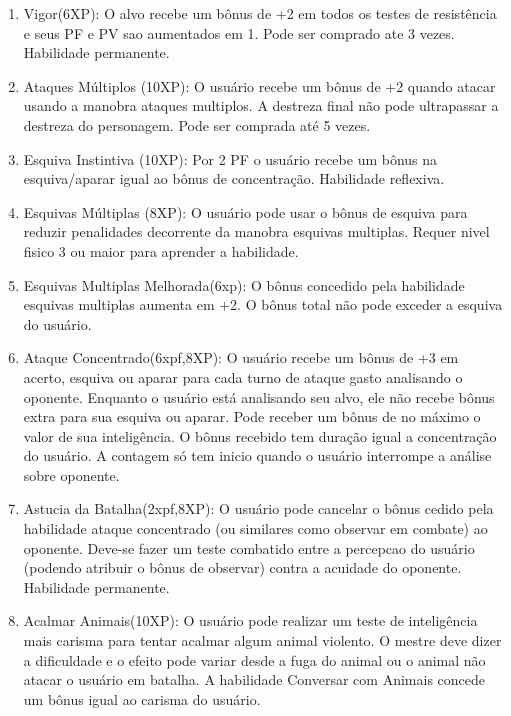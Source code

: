 \begin{enumerate}
	
	\item Vigor(6XP): O alvo recebe um bônus de +2 em todos os testes de resistência e seus PF e PV sao aumentados em 1. Pode ser comprado ate 3 vezes. Habilidade permanente.

	\item Ataques Múltiplos (10XP): O usuário recebe um bônus de +2 quando atacar usando a manobra ataques multiplos. A destreza final não pode ultrapassar a destreza do personagem. Pode ser comprada até 5 vezes.

	\item Esquiva Instintiva (10XP): Por 2 PF o usuário recebe um bônus na esquiva/aparar igual ao bônus de concentração. Habilidade reflexiva.
	
	\item Esquivas Múltiplas (8XP): O usuário pode usar o bônus de esquiva para reduzir penalidades decorrente da manobra esquivas multiplas. Requer nivel fisico 3 ou maior para aprender a habilidade.	

	\item Esquivas Multiplas Melhorada(6xp): O bônus concedido pela habilidade esquivas multiplas aumenta em +2. O bônus total não pode exceder a esquiva do usuário.

	\item Ataque Concentrado(6xpf,8XP): O usuário recebe um bônus de +3 em acerto, esquiva ou aparar para cada turno de ataque gasto analisando o oponente. Enquanto o usuário está analisando seu alvo, ele não recebe bônus extra para sua esquiva ou aparar. Pode receber um bônus de no máximo o valor de sua inteligência. O bônus recebido tem duração igual a concentração do usuário. A contagem só tem inicio quando o usuário interrompe a análise sobre oponente.

	\item Astucia da Batalha(2xpf,8XP): O usuário pode cancelar o bônus cedido pela habilidade ataque concentrado (ou similares como observar em combate) ao oponente. Deve-se fazer um teste combatido entre a percepcao do usuário (podendo atribuir o bônus de observar) contra a acuidade do oponente. Habilidade permanente.
	
  \item Acalmar Animais(10XP): O usuário pode realizar um teste de inteligência mais carisma para tentar acalmar algum animal violento. O mestre deve dizer a dificuldade e o efeito pode variar desde a fuga do animal ou o animal não atacar o usuário em batalha. A habilidade Conversar com Animais concede um bônus igual ao carisma do usuário.


\end{enumerate}
